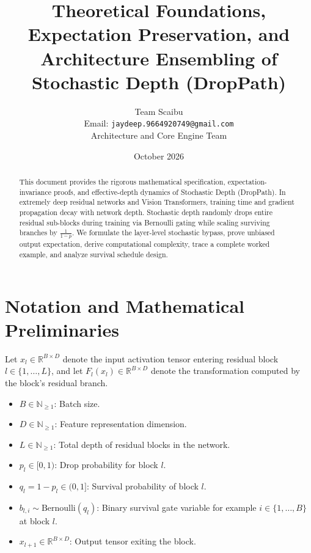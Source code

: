 \documentclass[11pt,a4paper]{article}
\title{\textbf{Theoretical Foundations, Expectation Preservation, and Architecture Ensembling of Stochastic Depth (DropPath)}}
\author{Team Scaibu \\ \small Email: \texttt{jaydeep.9664920749@gmail.com} \\ \small Architecture and Core Engine Team}
\date{October 2026}
\theoremstyle{definition}
\begin{document}
\maketitle

\begin{abstract}
This document provides the rigorous mathematical specification, expectation-invariance proofs, and effective-depth dynamics of Stochastic Depth (DropPath). In extremely deep residual networks and Vision Transformers, training time and gradient propagation decay with network depth. Stochastic depth randomly drops entire residual sub-blocks during training via Bernoulli gating while scaling surviving branches by $\frac{1}{1-p}$. We formulate the layer-level stochastic bypass, prove unbiased output expectation, derive computational complexity, trace a complete worked example, and analyze survival schedule design.
\end{abstract}

\section{Notation and Mathematical Preliminaries}

Let $x_l \in \mathbb{R}^{B \times D}$ denote the input activation tensor entering residual block $l \in \{1, \dots, L\}$, and let $F_l(x_l) \in \mathbb{R}^{B \times D}$ denote the transformation computed by the block's residual branch.

\begin{itemize}
    \item $B \in \mathbb{N}_{\ge 1}$: Batch size.
    \item $D \in \mathbb{N}_{\ge 1}$: Feature representation dimension.
    \item $L \in \mathbb{N}_{\ge 1}$: Total depth of residual blocks in the network.
    \item $p_l \in [0, 1)$: Drop probability for block $l$.
    \item $q_l = 1 - p_l \in (0, 1]$: Survival probability of block $l$.
    \item $b_{l, i} \sim \text{Bernoulli}(q_l)$: Binary survival gate variable for example $i \in \{1, \dots, B\}$ at block $l$.
    \item $x_{l+1} \in \mathbb{R}^{B \times D}$: Output tensor exiting the block.
\end{itemize}
\end{document}
